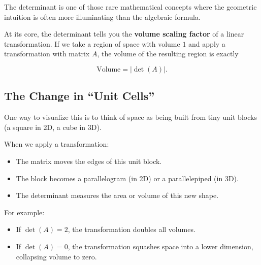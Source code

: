 \documentclass[11pt,openany]{book}
\theoremstyle{definition}
\begin{document}
The determinant is one of those rare mathematical concepts where the geometric intuition is often more illuminating than the algebraic formula.

\medskip

At its core, the determinant tells you the \textbf{volume scaling factor} of a linear transformation. 
If we take a region of space with volume $1$ and apply a transformation with matrix $A$, 
the volume of the resulting region is exactly

\[
\text{Volume} = |\det(A)|.
\]

\medskip

\subsection{The Change in ``Unit Cells''}

One way to visualize this is to think of space as being built from tiny unit blocks 
(a square in 2D, a cube in 3D).

\medskip

When we apply a transformation:

\begin{itemize}
  \item The matrix moves the edges of this unit block.
  \item The block becomes a parallelogram (in 2D) or a parallelepiped (in 3D).
  \item The determinant measures the area or volume of this new shape.
\end{itemize}

\medskip

For example:

\begin{itemize}
  \item If $\det(A) = 2$, the transformation doubles all volumes.
  \item If $\det(A) = 0$, the transformation squashes space into a lower dimension, 
  collapsing volume to zero.
\end{itemize}
\end{document}
